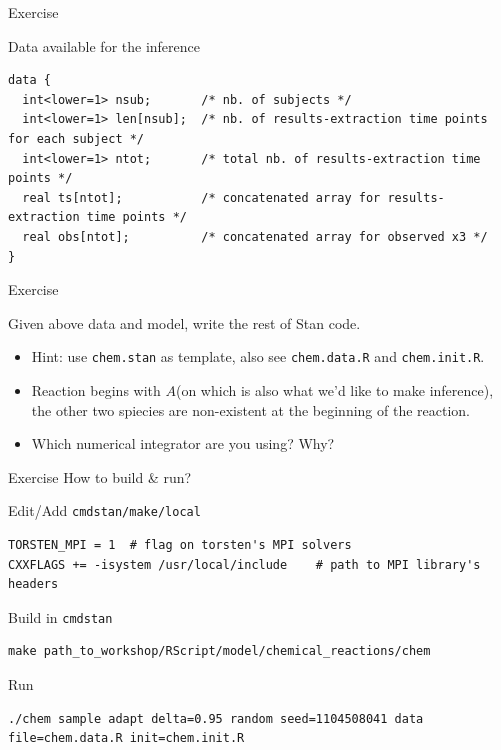 \documentclass[presentation, allowframebreaks]{beamer}
\begin{document}
\begin{frame}[fragile,label={sec:orgdb175ac}]{Exercise}
 \begin{block}{Data available for the inference}
\begin{verbatim}
data {
  int<lower=1> nsub;       /* nb. of subjects */
  int<lower=1> len[nsub];  /* nb. of results-extraction time points for each subject */
  int<lower=1> ntot;       /* total nb. of results-extraction time points */
  real ts[ntot];           /* concatenated array for results-extraction time points */
  real obs[ntot];          /* concatenated array for observed x3 */
}
\end{verbatim}
\end{block}
\end{frame}

\begin{frame}[fragile,label={sec:orgd48bd03}]{Exercise}
 \begin{block}{Given above data and model, write the rest of Stan code.}
\begin{itemize}
\item Hint: use \texttt{chem.stan} as template, also see \texttt{chem.data.R} and \texttt{chem.init.R}.
\item Reaction begins with \(A\)(on which is also what we'd
like to make inference), the other two spiecies are
non-existent at the beginning of the reaction.
\item Which numerical integrator are you using? Why?
\end{itemize}
\end{block}
\end{frame}

\begin{frame}[fragile,label={sec:orgc8485d8}]{Exercise}
 How to build \& run?
\begin{block}{Edit/Add \texttt{cmdstan/make/local}}
\begin{verbatim}
TORSTEN_MPI = 1  # flag on torsten's MPI solvers
CXXFLAGS += -isystem /usr/local/include    # path to MPI library's headers
\end{verbatim}
\end{block}
\begin{block}{Build in \texttt{cmdstan}}
\begin{verbatim}
make path_to_workshop/RScript/model/chemical_reactions/chem
\end{verbatim}
\end{block}
\begin{block}{Run}
\begin{verbatim}
./chem sample adapt delta=0.95 random seed=1104508041 data file=chem.data.R init=chem.init.R
\end{verbatim}
\end{block}
\end{frame}
\end{document}
